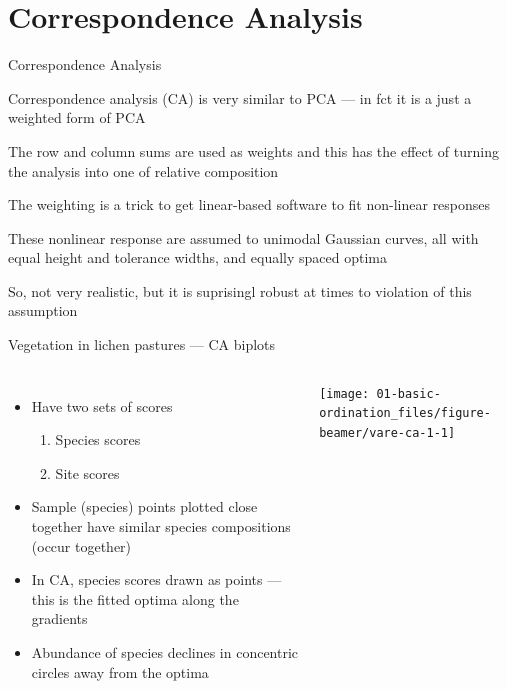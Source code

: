 \documentclass[10pt,ignorenonframetext,compress, aspectratio=169]{beamer}
\providecommand{\tightlist}{%
  \setlength{\itemsep}{0pt}\setlength{\parskip}{0pt}}
\newcommand{\columnsbegin}{\begin{columns}}
\newcommand{\columnsend}{\end{columns}}
\begin{document}
\section{Correspondence Analysis}\label{correspondence-analysis}

\begin{frame}{Correspondence Analysis}

Correspondence analysis (CA) is very similar to PCA --- in fct it is a
just a weighted form of PCA

The row and column sums are used as weights and this has the effect of
turning the analysis into one of relative composition

The weighting is a trick to get linear-based software to fit non-linear
responses

These nonlinear response are assumed to unimodal Gaussian curves, all
with equal height and tolerance widths, and equally spaced optima

So, not very realistic, but it is suprisingl robust at times to
violation of this assumption

\end{frame}

\begin{frame}{Vegetation in lichen pastures --- CA biplots}

\columnsbegin
{}

\begin{itemize}
\tightlist
\item
  Have two sets of scores

  \begin{enumerate}
  \def\labelenumi{\arabic{enumi}.}
  \tightlist
  \item
    Species scores
  \item
    Site scores
  \end{enumerate}
\item
  Sample (species) points plotted close together have similar species
  compositions (occur together)
\item
  In CA, species scores drawn as points --- this is the fitted optima
  along the gradients
\item
  Abundance of species declines in concentric circles away from the
  optima
\end{itemize}


\begin{center}\texttt{[image: 01-basic-ordination\_files/figure-beamer/vare-ca-1-1]} \end{center}

\columnsend

\end{frame}
\end{document}
